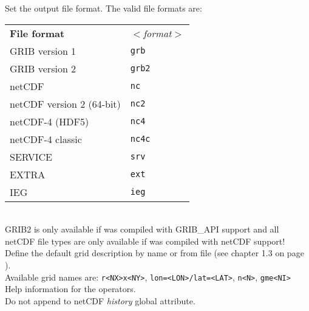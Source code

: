 \begin{tabbing}
         \> Set the output file format. The valid file formats are: \\
         \> \parbox[r]{3in}{
              \vspace*{1mm}
              \hspace*{0cm}\begin{tabular}{|l|l|}
              \hline
              \rowcolor{pcolor2}
              {\bf File format}          & \sl $<$format$>$ \\
               GRIB version 1            & {\tt grb}  \\
               GRIB version 2            & {\tt grb2} \\
               netCDF                    & {\tt nc}   \\
               netCDF version 2 (64-bit) & {\tt nc2}  \\
               netCDF-4 (HDF5)           & {\tt nc4}  \\
               netCDF-4 classic          & {\tt nc4c} \\
               SERVICE                   & {\tt srv}  \\
               EXTRA                     & {\tt ext}  \\
               IEG                       & {\tt ieg}  \\
              \hline
              \end{tabular}
              \vspace*{1mm}
            } \\
         \> GRIB2 is only available if {\CDO} was compiled with GRIB\_API support and all \\
         \> netCDF file types are only available if {\CDO} was compiled with netCDF support! \\
         \> Define the default grid description by name or from file (see chapter 1.3 on page \pageref{GRID_DESCRIPTION}). \\
         \> Available grid names are: {\tt r<NX>x<NY>}, {\tt lon=<LON>/lat=<LAT>}, {\tt n<N>}, {\tt gme<NI>} \\
         \> Help information for the operators. \\
         \> Do not append to netCDF {\it history} global attribute. \\

\end{tabbing}
